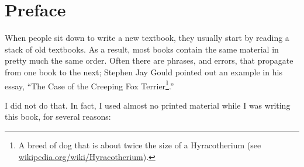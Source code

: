 \documentclass[12pt]{book}
\begin{document}
\chapter{Preface}
\label{preface}













When people sit down to write a new textbook, they usually start by
reading a stack of old textbooks.  As a result, most books
contain the same material in pretty much the same order.  Often there
are phrases, and errors, that propagate from one book to the next;
Stephen Jay Gould pointed out an example in his essay, ``The Case of
the Creeping Fox Terrier\footnote{A breed of dog that is about twice
  the size of a Hyracotherium (see
  \url{wikipedia.org/wiki/Hyracotherium}).}.''

I did not do that.  In fact, I used almost no printed material while I
was writing this book, for several reasons:
\end{document}
